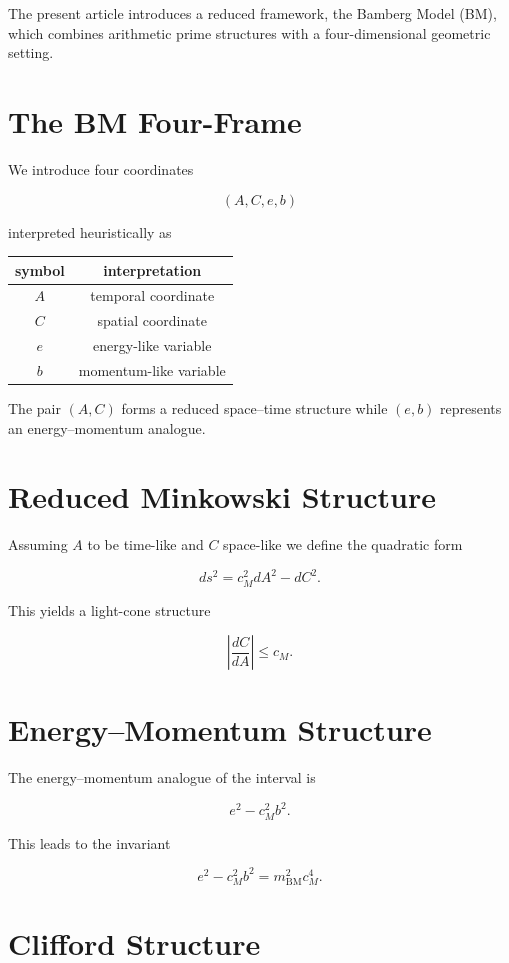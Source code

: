 \documentclass[11pt,a4paper]{article}
\begin{document}
	The present article introduces a reduced framework,
	the Bamberg Model (BM), which combines arithmetic
	prime structures with a four-dimensional geometric
	setting.
	
	\section{The BM Four-Frame}
	
	We introduce four coordinates
	
	\[
	(A,C,e,b)
	\]
	
	interpreted heuristically as
	
	\begin{center}
		\begin{tabular}{cc}
			symbol & interpretation \\
			\toprule
			$A$ & temporal coordinate \\
			$C$ & spatial coordinate \\
			$e$ & energy-like variable \\
			$b$ & momentum-like variable
		\end{tabular}
	\end{center}
	
	The pair $(A,C)$ forms a reduced space–time structure
	while $(e,b)$ represents an energy–momentum analogue.
	
	\section{Reduced Minkowski Structure}
	
	Assuming $A$ to be time-like and $C$ space-like
	we define the quadratic form
	
	\[
	ds^2=c_M^2 dA^2-dC^2 .
	\]
	
	This yields a light-cone structure
	
	\[
	\left|\frac{dC}{dA}\right|\le c_M .
	\]
	
	\section{Energy–Momentum Structure}
	
	The energy–momentum analogue of the interval is
	
	\[
	e^2-c_M^2 b^2 .
	\]
	
	This leads to the invariant
	
	\[
	e^2-c_M^2 b^2=m_{\mathrm{BM}}^2 c_M^4 .
	\]
	
	\section{Clifford Structure}
	
\end{document}
